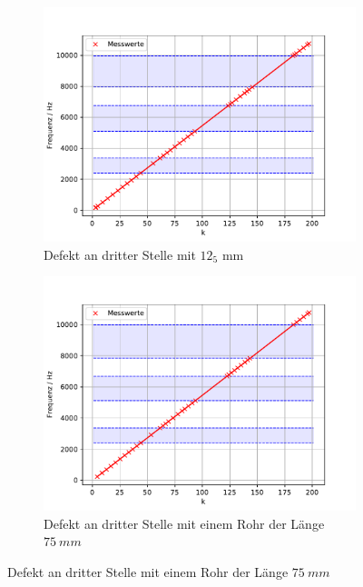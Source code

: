 
  \begin{figure}
   \centering
   \begin{subfigure}{0.48\textwidth}
    \centering
    \includegraphics[width=1.1\textwidth]{max.pdf}
    \caption{Defekt an dritter Stelle mit $12_5$ mm}
    \label{fig.Aufgabe121}
   \end{subfigure}
   \begin{subfigure}{0.48\textwidth}
    \centering
    \includegraphics[width=1.1\textwidth]{max2.pdf}
    \caption{Defekt an dritter Stelle mit einem Rohr der Länge $\SI{75}{mm}$}
    \label{fig.Aufgabe122}
   \end{subfigure}


\end{figure}
